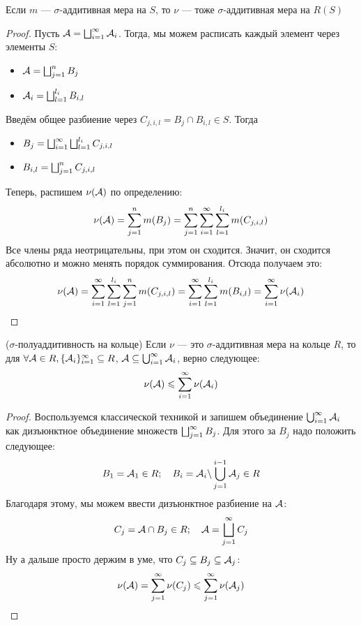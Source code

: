 \begin{theorem}
	Если $m$ --- $\sigma$-аддитивная мера на $S$, то $\nu$ --- тоже $\sigma$-аддитивная мера на $R(S)$
\end{theorem}

\begin{proof}
	Пусть $\mathcal{A} = \bigsqcup_{i = 1}^\infty \mathcal{A}_i$. Тогда, мы можем расписать каждый элемент через элементы $S$:
	\begin{itemize}
		\item \(\mathcal{A} = \bigsqcup_{j = 1}^n B_j\)
		
		\item \(\mathcal{A}_i = \bigsqcup_{l = 1}^{l_i} B_{i, l}\)
	\end{itemize}
	Введём общее разбиение через $C_{j, i, l} = B_j \cap B_{i, l} \in S$. Тогда
	\begin{itemize}
		\item \(B_j = \bigsqcup_{i = 1}^\infty \bigsqcup_{l = 1}^{l_i} C_{j, i, l}\)
		
		\item \(B_{i, l} = \bigsqcup_{j = 1}^n C_{j, i, l}\)
	\end{itemize}
	Теперь, распишем $\nu(\mathcal{A})$ по определению:
	\[
		\nu(\mathcal{A}) = \sum_{j = 1}^n m(B_j) = \sum_{j = 1}^n \sum_{i = 1}^\infty \sum_{l = 1}^{l_i} m(C_{j, i, l})
	\]
	Все члены ряда неотрицательны, при этом он сходится. Значит, он сходится абсолютно и можно менять порядок суммирования. Отсюда получаем это:
	\[
		\nu(\mathcal{A}) = \sum_{i = 1}^\infty \sum_{l = 1}^{l_i} \sum_{j = 1}^n m(C_{j, i, l}) = \sum_{i = 1}^\infty \sum_{l = 1}^{l_i} m(B_{i, l}) = \sum_{i = 1}^\infty \nu(\mathcal{A}_i)
	\]
\end{proof}

\begin{theorem}
	($\sigma$-полуаддитивность на кольце) Если $\nu$ --- это $\sigma$-аддитивная мера на кольце $R$, то для $\forall \mathcal{A} \in R, \{\mathcal{A}_i\}_{i = 1}^\infty \subseteq R$, $\mathcal{A} \subseteq \bigcup_{i = 1}^\infty \mathcal{A}_i$, верно следующее:
	\[
		\nu(\mathcal{A}) \leqslant \sum_{i = 1}^\infty \nu(\mathcal{A}_i)
	\]
\end{theorem}

\begin{proof}
	Воспользуемся классической техникой и запишем объединение $\bigcup_{i = 1}^\infty \mathcal{A}_i$ как дизъюнктное объединение множеств $\bigsqcup_{j = 1}^\infty B_j$. Для этого за $B_j$ надо положить следующее:
	\[
		B_1 = \mathcal{A}_1 \in R; \quad B_i = \mathcal{A}_i \backslash \bigcup_{j = 1}^{i - 1} \mathcal{A}_j \in R
	\]
	Благодаря этому, мы можем ввести дизъюнктное разбиение на $\mathcal{A}$:
	\[
		C_j = \mathcal{A} \cap B_j \in R; \quad \mathcal{A} = \bigsqcup_{j = 1}^\infty C_j
	\]
	Ну а дальше просто держим в уме, что $C_j \subseteq B_j \subseteq \mathcal{A}_j$:
	\[
		\nu(\mathcal{A}) = \sum_{j = 1}^\infty \nu(C_j) \leqslant \sum_{j = 1}^\infty \nu(\mathcal{A}_j)
	\]
\end{proof}

